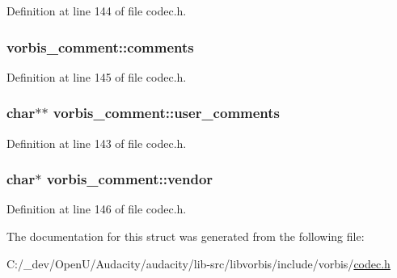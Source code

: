 Definition at line 144 of file codec.\+h.

\subsubsection[{\texorpdfstring{comments}{comments}}]{ vorbis\+\_\+comment\+::comments}\hypertarget{structvorbis__comment_aa338208fb0f485b3818832a7d07dbe92}{}\label{structvorbis__comment_aa338208fb0f485b3818832a7d07dbe92}


Definition at line 145 of file codec.\+h.

\subsubsection[{\texorpdfstring{user\+\_\+comments}{user_comments}}]{\setlength{\rightskip}{0pt plus 5cm}char$\ast$$\ast$ vorbis\+\_\+comment\+::user\+\_\+comments}\hypertarget{structvorbis__comment_ac45cb70542b0be5ce3e8d85db6df48ec}{}\label{structvorbis__comment_ac45cb70542b0be5ce3e8d85db6df48ec}


Definition at line 143 of file codec.\+h.

\subsubsection[{\texorpdfstring{vendor}{vendor}}]{\setlength{\rightskip}{0pt plus 5cm}char$\ast$ vorbis\+\_\+comment\+::vendor}\hypertarget{structvorbis__comment_a1f25158a2c045a6dd8a13b33b34612d3}{}\label{structvorbis__comment_a1f25158a2c045a6dd8a13b33b34612d3}


Definition at line 146 of file codec.\+h.



The documentation for this struct was generated from the following file\+:\begin{DoxyCompactItemize}
\item 
C\+:/\+\_\+dev/\+Open\+U/\+Audacity/audacity/lib-\/src/libvorbis/include/vorbis/\hyperlink{codec_8h}{codec.\+h}\end{DoxyCompactItemize}
